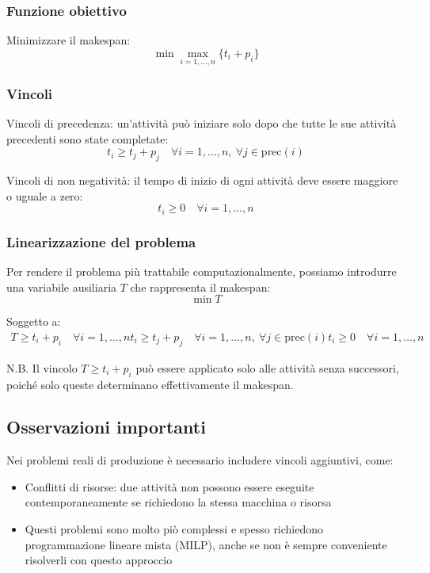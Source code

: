 \subsubsection{Funzione obiettivo}
Minimizzare il makespan:
\[
\min \max_{i=1,\dots,n} \{ t_i + p_i \}
\]

\subsubsection{Vincoli}
Vincoli di precedenza: un'attività può iniziare solo dopo che tutte le sue attività precedenti sono state completate:
\[
t_i \geq t_j + p_j \quad \forall i = 1,\dots,n,\ \forall j \in \text{prec}(i)
\]

Vincoli di non negatività: il tempo di inizio di ogni attività deve essere maggiore o uguale a zero:
\[
t_i \geq 0 \quad \forall i = 1,\dots,n
\]

\subsubsection{Linearizzazione del problema}
Per rendere il problema più trattabile computazionalmente, possiamo introdurre una variabile ausiliaria $T$ che rappresenta il makespan:
\[
\min T
\]

Soggetto a:
\[
\begin{aligned}
T \geq t_i + p_i \quad \forall i = 1,\dots,n
t_i \geq t_j + p_j \quad \forall i = 1,\dots,n,\ \forall j \in \text{prec}(i)
t_i \geq 0 \quad \forall i = 1,\dots,n
\end{aligned}
\]

N.B. Il vincolo $T \geq t_i + p_i$ può essere applicato solo alle attività 
senza successori, poiché solo queste determinano effettivamente il makespan.

\subsection{Osservazioni importanti}
Nei problemi reali di produzione è necessario includere vincoli aggiuntivi, come:
\begin{itemize}
    \item Conflitti di risorse: due attività non possono essere eseguite contemporaneamente se richiedono la stessa macchina o risorsa
    \item Questi problemi sono molto piò complessi e spesso richiedono programmazione lineare mista (MILP), anche se non è sempre conveniente risolverli con questo approccio
\end{itemize}

